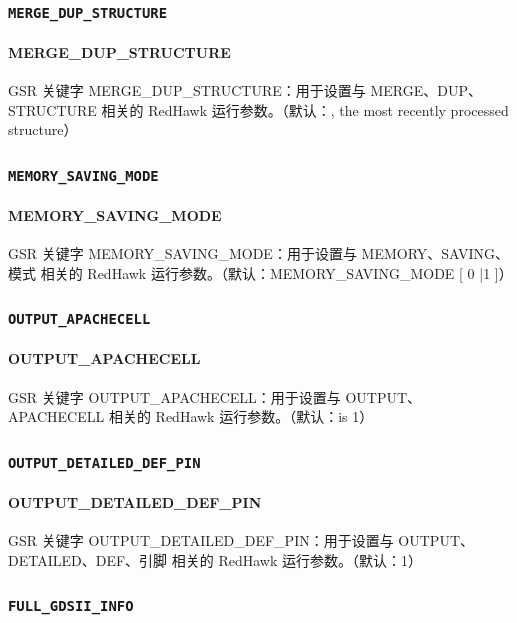 \subsubsection{\texttt{MERGE_DUP_STRUCTURE}}
\paragraph*{MERGE_DUP_STRUCTURE}

GSR 关键字 MERGE_DUP_STRUCTURE：用于设置与 MERGE、DUP、STRUCTURE 相关的 RedHawk 运行参数。（默认：, the most recently processed structure）

\subsubsection{\texttt{MEMORY_SAVING_MODE}}
\paragraph*{MEMORY_SAVING_MODE}

GSR 关键字 MEMORY_SAVING_MODE：用于设置与 MEMORY、SAVING、模式 相关的 RedHawk 运行参数。（默认：MEMORY_SAVING_MODE [ 0 |1 ]）

\subsubsection{\texttt{OUTPUT_APACHECELL}}
\paragraph*{OUTPUT_APACHECELL}

GSR 关键字 OUTPUT_APACHECELL：用于设置与 OUTPUT、APACHECELL 相关的 RedHawk 运行参数。（默认：is 1）

\subsubsection{\texttt{OUTPUT_DETAILED_DEF_PIN}}
\paragraph*{OUTPUT_DETAILED_DEF_PIN}

GSR 关键字 OUTPUT_DETAILED_DEF_PIN：用于设置与 OUTPUT、DETAILED、DEF、引脚 相关的 RedHawk 运行参数。（默认：1）

\subsubsection{\texttt{FULL_GDSII_INFO}}
